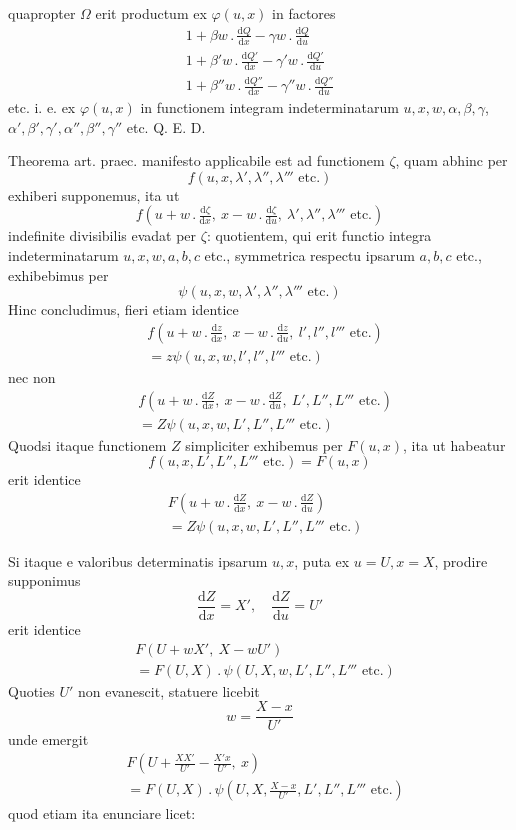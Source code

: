 quapropter $\Omega$ erit productum ex $\varphi(u,x)$ in factores
\[
\begin{gathered}
1+\beta w\, .\,\frac{\mathrm dQ}{\mathrm dx}-\gamma w\, .\,\frac{\mathrm dQ}{\mathrm du}\\
1+\beta'w\, .\,\frac{\mathrm dQ'}{\mathrm dx}-\gamma'w\, .\,\frac{\mathrm dQ'}{\mathrm du}\\
1+\beta''w\, .\,\frac{\mathrm dQ''}{\mathrm dx}-\gamma''w\, .\,\frac{\mathrm dQ''}{\mathrm du}
\end{gathered}
\]
etc. i. e. ex $\varphi(u,x)$ in functionem integram indeterminatarum $u,x,w,\alpha,\beta,\gamma$,
$\alpha',\beta',\gamma',\alpha'',\beta'',\gamma''$ etc. Q. E. D.

Theorema art. praec. manifesto applicabile est ad functionem $\zeta$, quam abhinc per
\[
f(u,x,\lambda',\lambda'',\lambda'''\text{ etc.})
\]
exhiberi supponemus, ita ut
\[
f(u+w\, .\,\tfrac{\mathrm d\zeta}{\mathrm dx},\ x-w\, .\,\tfrac{\mathrm d\zeta}{\mathrm du},\ \lambda',\lambda'',\lambda'''\text{ etc.})
\]
indefinite divisibilis evadat per $\zeta$: quotientem, qui erit functio integra indeterminatarum $u,x,w,a,b,c$ etc., symmetrica respectu ipsarum $a,b,c$ etc., exhibebimus per
\[
\psi(u,x,w,\lambda',\lambda'',\lambda'''\text{ etc.})
\]
Hinc concludimus, fieri etiam identice
\[
\begin{aligned}
&f(u+w\, .\,\tfrac{\mathrm dz}{\mathrm dx},\ x-w\, .\,\tfrac{\mathrm dz}{\mathrm du},\ l',l'',l'''\text{ etc.})\\
&=z\psi(u,x,w,l',l'',l'''\text{ etc.})
\end{aligned}
\]
nec non
\[
\begin{aligned}
&f(u+w\, .\,\tfrac{\mathrm dZ}{\mathrm dx},\ x-w\, .\,\tfrac{\mathrm dZ}{\mathrm du},\ L',L'',L'''\text{ etc.})\\
&=Z\psi(u,x,w,L',L'',L'''\text{ etc.})
\end{aligned}
\]
Quodsi itaque functionem $Z$ simpliciter exhibemus per $F(u,x)$, ita ut habeatur
\[
f(u,x,L',L'',L'''\text{ etc.})=F(u,x)
\]
erit identice
\[
\begin{aligned}
&F(u+w\, .\,\tfrac{\mathrm dZ}{\mathrm dx},\ x-w\, .\,\tfrac{\mathrm dZ}{\mathrm du})\\
&=Z\psi(u,x,w,L',L'',L'''\text{ etc.})
\end{aligned}
\]

Si itaque e valoribus determinatis ipsarum $u,x$, puta ex $u=U,x=X$,
prodire supponimus
\[
\frac{\mathrm dZ}{\mathrm dx}=X',\quad\frac{\mathrm dZ}{\mathrm du}=U'
\]
erit identice
\[
\begin{aligned}
&F(U+wX',\ X-wU')\\
&=F(U,X)\, .\,\psi(U,X,w,L',L'',L'''\text{ etc.})
\end{aligned}
\]
Quoties $U'$ non evanescit, statuere licebit
\[
w=\frac{X-x}{U'}
\]
unde emergit
\[
\begin{aligned}
&F(U+\tfrac{XX'}{U'}-\tfrac{X'x}{U'},\ x)\\
&=F(U,X)\, .\,\psi(U,X,\tfrac{X-x}{U'},L',L'',L'''\text{ etc.})
\end{aligned}
\]
quod etiam ita enunciare licet:

